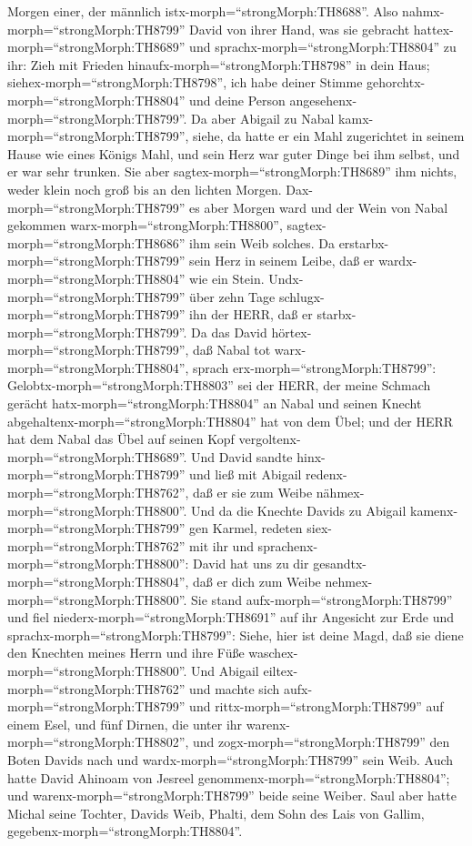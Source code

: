 Morgen einer, der männlich istx-morph=``strongMorph:TH8688''.
 Also nahmx-morph=``strongMorph:TH8799'' David von ihrer
Hand, was sie gebracht hattex-morph=``strongMorph:TH8689'' und
sprachx-morph=``strongMorph:TH8804'' zu ihr: Zieh mit Frieden
hinaufx-morph=``strongMorph:TH8798'' in dein Haus;
siehex-morph=``strongMorph:TH8798'', ich habe deiner Stimme
gehorchtx-morph=``strongMorph:TH8804'' und deine Person
angesehenx-morph=``strongMorph:TH8799''.  Da aber Abigail
zu Nabal kamx-morph=``strongMorph:TH8799'', siehe, da hatte er ein Mahl
zugerichtet in seinem Hause wie eines Königs Mahl, und sein Herz war
guter Dinge bei ihm selbst, und er war sehr trunken. Sie aber
sagtex-morph=``strongMorph:TH8689'' ihm nichts, weder klein noch groß
bis an den lichten Morgen. 
Dax-morph=``strongMorph:TH8799'' es aber Morgen ward und der Wein von
Nabal gekommen warx-morph=``strongMorph:TH8800'',
sagtex-morph=``strongMorph:TH8686'' ihm sein Weib solches. Da
erstarbx-morph=``strongMorph:TH8799'' sein Herz in seinem Leibe, daß er
wardx-morph=``strongMorph:TH8804'' wie ein Stein. 
Undx-morph=``strongMorph:TH8799'' über zehn Tage
schlugx-morph=``strongMorph:TH8799'' ihn der HERR, daß er
starbx-morph=``strongMorph:TH8799''.  Da das David
hörtex-morph=``strongMorph:TH8799'', daß Nabal tot
warx-morph=``strongMorph:TH8804'', sprach
erx-morph=``strongMorph:TH8799'': Gelobtx-morph=``strongMorph:TH8803''
sei der HERR, der meine Schmach gerächt
hatx-morph=``strongMorph:TH8804'' an Nabal und seinen Knecht
abgehaltenx-morph=``strongMorph:TH8804'' hat von dem Übel; und der HERR
hat dem Nabal das Übel auf seinen Kopf
vergoltenx-morph=``strongMorph:TH8689''. Und David sandte
hinx-morph=``strongMorph:TH8799'' und ließ mit Abigail
redenx-morph=``strongMorph:TH8762'', daß er sie zum Weibe
nähmex-morph=``strongMorph:TH8800''.  Und da die Knechte
Davids zu Abigail kamenx-morph=``strongMorph:TH8799'' gen Karmel,
redeten siex-morph=``strongMorph:TH8762'' mit ihr und
sprachenx-morph=``strongMorph:TH8800'': David hat uns zu dir
gesandtx-morph=``strongMorph:TH8804'', daß er dich zum Weibe
nehmex-morph=``strongMorph:TH8800''.  Sie stand
aufx-morph=``strongMorph:TH8799'' und fiel
niederx-morph=``strongMorph:TH8691'' auf ihr Angesicht zur Erde und
sprachx-morph=``strongMorph:TH8799'': Siehe, hier ist deine Magd, daß
sie diene den Knechten meines Herrn und ihre Füße
waschex-morph=``strongMorph:TH8800''.  Und Abigail
eiltex-morph=``strongMorph:TH8762'' und machte sich
aufx-morph=``strongMorph:TH8799'' und rittx-morph=``strongMorph:TH8799''
auf einem Esel, und fünf Dirnen, die unter ihr
warenx-morph=``strongMorph:TH8802'', und
zogx-morph=``strongMorph:TH8799'' den Boten Davids nach und
wardx-morph=``strongMorph:TH8799'' sein Weib.  Auch hatte
David Ahinoam von Jesreel genommenx-morph=``strongMorph:TH8804''; und
warenx-morph=``strongMorph:TH8799'' beide seine Weiber. 
Saul aber hatte Michal seine Tochter, Davids Weib, Phalti, dem Sohn des
Lais von Gallim, gegebenx-morph=``strongMorph:TH8804''.

